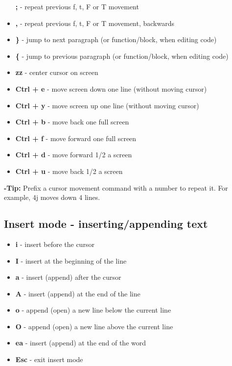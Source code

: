 \documentclass[twocolumn]{article}
\providecommand{\tightlist}{%
  \setlength{\itemsep}{0pt}\setlength{\parskip}{0pt}}
\begin{document}
\begin{itemize}
  \textbf{;} - repeat previous f, t, F or T movement
\item
  \textbf{,} - repeat previous f, t, F or T movement, backwards
\item
  \textbf{\}} - jump to next paragraph (or function/block, when editing
  code)
\item
  \textbf{\{} - jump to previous paragraph (or function/block, when
  editing code)
\item
  \textbf{zz} - center cursor on screen
\item
  \textbf{Ctrl + e} - move screen down one line (without moving cursor)
\item
  \textbf{Ctrl + y} - move screen up one line (without moving cursor)
\item
  \textbf{Ctrl + b} - move back one full screen
\item
  \textbf{Ctrl + f} - move forward one full screen
\item
  \textbf{Ctrl + d} - move forward 1/2 a screen
\item
  \textbf{Ctrl + u} - move back 1/2 a screen
\end{itemize}

\textbf{-Tip:} Prefix a cursor movement command with a number to repeat
it. For example, 4j moves down 4 lines.

\hypertarget{insert-mode---insertingappending-text}{%
\subsection{Insert mode - inserting/appending
text}\label{insert-mode---insertingappending-text}}

\begin{itemize}
\tightlist
\item
  \textbf{i} - insert before the cursor
\item
  \textbf{I} - insert at the beginning of the line
\item
  \textbf{a} - insert (append) after the cursor
\item
  \textbf{A} - insert (append) at the end of the line
\item
  \textbf{o} - append (open) a new line below the current line
\item
  \textbf{O} - append (open) a new line above the current line
\item
  \textbf{ea} - insert (append) at the end of the word
\item
  \textbf{Esc} - exit insert mode
\end{itemize}
\end{document}
